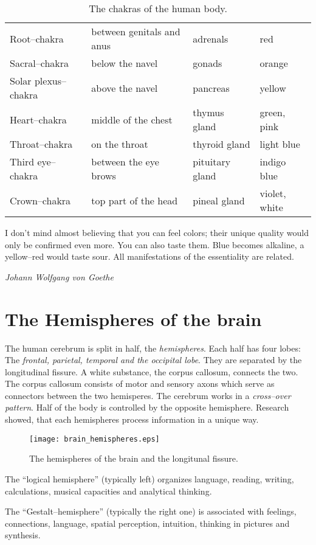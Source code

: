 \documentclass[../main.tex]{subfiles}
\begin{document}
 \begin{table}[htb]
  \centering
  \begin{tabular}{llll}
    Root--chakra & between genitals and anus & adrenals & red \\
    Sacral--chakra & below the navel & gonads & orange \\
    Solar plexus--chakra & above the navel & pancreas & yellow \\
    Heart--chakra & middle of the chest & thymus gland & green, pink \\
    Throat--chakra & on the throat & thyroid gland & light blue \\
    Third eye--chakra & between the eye brows & pituitary gland & indigo blue \\
    Crown--chakra & top part of the head & pineal gland & violet, white
  \end{tabular}
  \caption{The chakras of the human body.}
\end{table}


\epigraph{I don't mind almost believing that you can feel colors; their unique quality would only be confirmed even more. You can also taste them. Blue becomes alkaline, a yellow--red would taste sour. All manifestations of the essentiality are related.}{\textit{Johann Wolfgang von Goethe}}

\chapter{The Hemispheres of the brain}

The human cerebrum is split in half, the \emph{hemispheres}.
Each half has four lobes: The \emph{frontal, parietal, temporal and the occipital lobe}.
They are separated by the longitudinal fissure.
A white substance, the {corpus callosum}, connects the two.
The corpus callosum consists of motor and sensory axons which serve as connectors between the two hemisperes.
The cerebrum works in a \emph{cross--over pattern}.
Half of the body is controlled by the opposite hemisphere.
Research showed, that each hemispheres process information in a unique way.

\begin{figure}[htb]
  \centering
  \texttt{[image: brain\_hemispheres.eps]}
  \caption{The hemispheres of the brain and the longitunal fissure\cite{needpix}.}
\end{figure}


The ``logical hemisphere'' (typically left) organizes language, reading, writing, calculations, musical capacities and analytical thinking.

The ``Gestalt--hemisphere'' (typically the right one) is associated with feelings, connections, language, spatial perception, intuition, thinking in pictures and synthesis.
\end{document}
